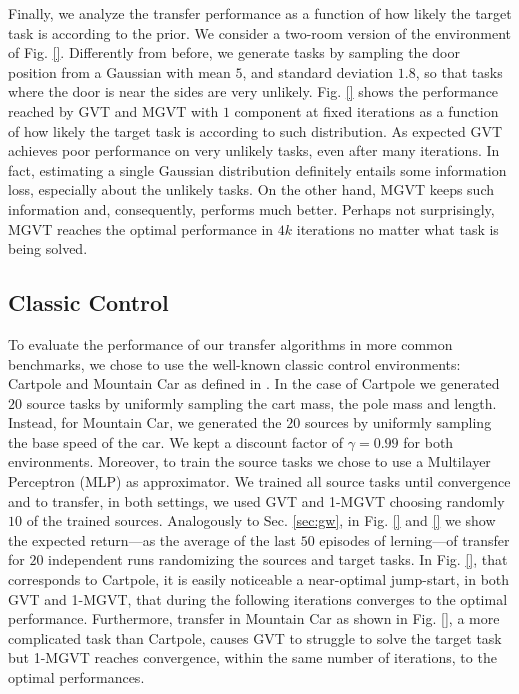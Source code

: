 \documentclass{article}
\begin{document}
Finally, we analyze the transfer performance as a function of how likely the target task is according to the prior. We consider a two-room version of the environment of Fig. \ref{}. Differently from before, we generate tasks by sampling the door position from a Gaussian with mean $5$, and standard deviation $1.8$, so that tasks where the door is near the sides are very unlikely. Fig. \ref{} shows the performance reached by GVT and MGVT with $1$ component at fixed iterations as a function of how likely the target task is according to such distribution. As expected GVT achieves poor performance on very unlikely tasks, even after many iterations. In fact, estimating a single Gaussian distribution definitely entails some information loss, especially about the unlikely tasks. On the other hand, MGVT keeps such information and, consequently, performs much better. Perhaps not surprisingly, MGVT reaches the optimal performance in $4k$ iterations no matter what task is being solved.

\subsection{Classic Control} \label{sec:cc}

To evaluate the performance of our transfer algorithms in more common benchmarks, we chose to use the well-known classic control environments: Cartpole and Mountain Car as defined in \citep{sutton1998reinforcement}. In the case of Cartpole we generated $20$ source tasks by uniformly sampling the cart mass, the pole mass and length. Instead, for Mountain Car, we generated the $20$ sources by uniformly sampling the base speed of the car. We kept a discount factor of $\gamma=0.99$ for both environments. Moreover, to train the source tasks we chose to use a Multilayer Perceptron (MLP) as approximator. We trained all source tasks until convergence and to transfer, in both settings, we used GVT and 1-MGVT choosing randomly $10$ of the trained sources. Analogously to Sec. \ref{sec:gw}, in Fig. \ref{} and \ref{} we show the expected return---as the average of the last $50$ episodes of lerning---of transfer for $20$ independent runs randomizing the sources and target tasks. In Fig. \ref{}, that corresponds to Cartpole, it is easily noticeable a near-optimal jump-start, in both GVT and 1-MGVT, that during the following iterations converges to the optimal performance. Furthermore, transfer in Mountain Car as shown in Fig. \ref{}, a more complicated task than Cartpole, causes GVT to struggle to solve the target task but 1-MGVT reaches convergence, within the same number of iterations, to the optimal performances.
\end{document}
